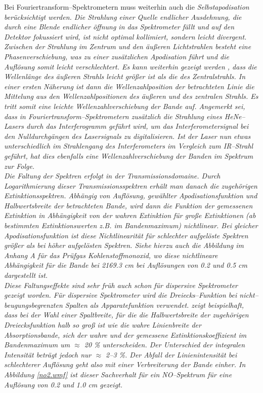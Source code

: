 Bei Fouriertransform--Spektrometern muss weiterhin auch die \it
Selbstapodisation \rm berücksichtigt werden. Die Strahlung einer
Quelle endlicher Ausdehnung, die durch eine Blende endlicher
öffnung in das Spektrometer fällt und auf den Detektor fokussiert
wird, ist nicht optimal kollimiert, sondern leicht divergent.
Zwischen der Strahlung im Zentrum und den äu{\ss}eren Lichtstrahlen
besteht eine Phasenverschiebung, was zu einer zusätzlichen
Apodisation führt und die Auflösung somit leicht verschlechtert.
Es kann weiterhin gezeigt werden \cite{griffiths86}, dass die
Wellenlänge des äu{\ss}eren Strahls leicht grö{\ss}er ist als die des
Zentralstrahls. In einer ersten Näherung ist dann die
Wellenzahlposition der betrachteten Linie die Mittelung aus den
Wellenzahlpositionen des äu{\ss}eren und des zentralen Strahls. Es
tritt somit eine leichte Wellenzahlverschiebung der Bande auf.
Angemerkt sei, dass in Fouriertransform--Spektrometern zusätzlich
die Strahlung eines HeNe--Lasers durch das Interferogramm geführt
wird, um das Interferometersignal bei den Nulldurchgängen des
Lasersignals zu digitalisieren. Ist der Laser nun etwas
unterschiedlich im Strahlengang des Interferometers im Vergleich
zum IR--Strahl geführt, hat dies ebenfalls eine
Wellenzahlverschiebung der Banden im Spektrum zur Folge.\\

Die Faltung der Spektren erfolgt in der Transmissionsdomaine.
Durch Logarithmierung dieser Transmissionsspektren erhält man
danach die zugehörigen Extinktionsspektren. Abhängig von
Auflösung, gewählter Apodisationsfunktion und Halbwertsbreite der
betrachteten Bande, wird dann die Funktion der gemessenen
Extinktion in Abhängigkeit von der wahren Extinktion für gro{\ss}e
Extinktionen (ab bestimmten Extinktionswerten z.B. im
Bandenmaximum) nichtlinear. Bei gleicher Apodisationsfunktion ist
diese Nichtlinearität für schlechter aufgelöste Spektren grö{\ss}er
als bei höher aufgelösten Spektren. Siehe hierzu auch die
Abbildung im Anhang A für das Prüfgas Kohlenstoffmonoxid, wo diese
nichtlineare Abhängigkeit für die Bande bei 2169.3 cm bei
Auflösungen von 0.2 und 0.5 cm dargestellt ist.\\

Diese Faltungseffekte sind sehr früh auch schon für dispersive
Spektrometer gezeigt worden. Für dispersive Spektrometer wird die
\it Dreiecks--\rm Funktion bei nicht--beugungsbegrenzten Spalten
als Apparatefunktion verwendet. \cite{ramsay52} zeigt
beispielhaft, dass bei der Wahl einer Spaltbreite, für die die
Halbwertsbreite der zugehörigen Dreiecksfunktion halb so gro{\ss} ist
wie die wahre Linienbreite der Absorptionsbande, sich der wahre
und der gemessene Extinktionskoeffizient im Bandenmaximum um
$\approx$ 20 \% unterscheiden. Der Unterschied der integralen
Intensität beträgt jedoch nur $\approx$ 2--3 \%. Der Abfall der
Linienintensität bei schlechterer Auflösung geht also mit einer
Verbreiterung der Bande einher. In Abbildung \ref{no2.wmf} ist
dieser Sachverhalt für ein NO--Spektrum für eine Auflösung
von 0.2 und 1.0 cm gezeigt.\\

